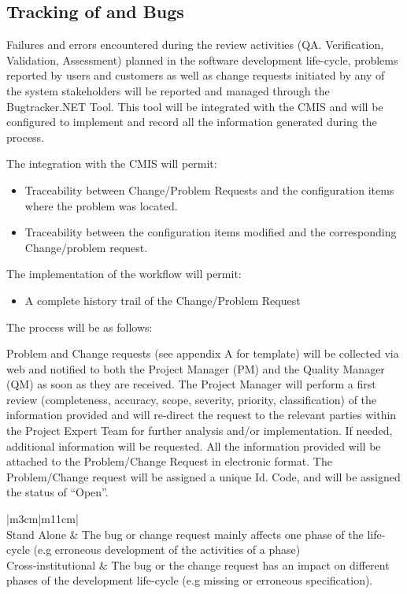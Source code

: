 \documentclass{template/openetcs_article}
\begin{document}
\subsection{Tracking of and Bugs}
Failures and errors encountered during the review activities (QA. Verification, Validation, Assessment) planned in the software development life-cycle, problems reported by users and customers as well as change requests initiated by any of the system stakeholders will be reported and managed through the Bugtracker.NET Tool. This tool will be integrated with the CMIS and will be configured to implement and record all the information generated during the process.

The integration with the CMIS will permit:
\begin{itemize}
\item Traceability between Change/Problem Requests and the configuration items where the problem was located.
\item Traceability between the configuration items modified and the corresponding Change/problem request. 
\end{itemize}
The implementation of the workflow will permit:
\begin{itemize}
\item A complete history trail of the Change/Problem Request
\end{itemize}

The process will be as follows:

Problem and Change requests (see appendix A for template) will be collected via web and notified to both the Project Manager (PM) and the Quality Manager (QM) as soon as they are received. The Project Manager will perform a first review (completeness, accuracy, scope, severity, priority, classification) of the information provided and will re-direct the request to the relevant parties within the Project Expert Team for further analysis and/or implementation. If needed, additional information will be requested. All the information provided will be attached to the Problem/Change Request in electronic format. The Problem/Change request will be assigned a unique Id. Code, and will be assigned the status of ``Open''.


\begin{flushleft}
\tablefirsthead{}
\tablehead{}
\tabletail{}
\tablelasttail{}
\begin{supertabular}{|m{3cm}|m{11cm}|}
\hline
{}\\\hline
Stand Alone &
The bug or change request mainly affects one phase of the life-cycle (e.g erroneous development of the activities of a phase)\\\hline
Cross-institutional &
The bug or the change request has an impact on different phases of the development life-cycle (e.g missing or erroneous specification).\\\hline
\end{supertabular}
\end{flushleft}
\end{document}
